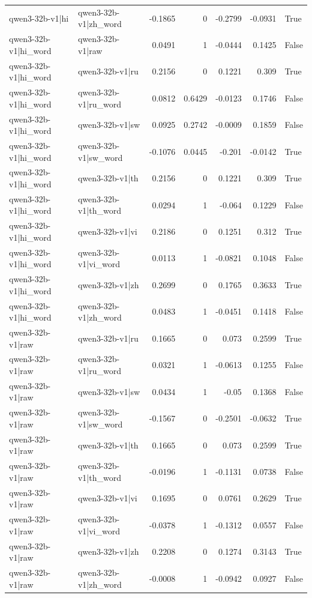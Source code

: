 \begin{table}
\begin{tabular}{l l r r r r l}
qwen3-32b-v1|hi & qwen3-32b-v1|zh_word & -0.1865 & 0 & -0.2799 & -0.0931 & True \\
qwen3-32b-v1|hi_word & qwen3-32b-v1|raw & 0.0491 & 1 & -0.0444 & 0.1425 & False \\
qwen3-32b-v1|hi_word & qwen3-32b-v1|ru & 0.2156 & 0 & 0.1221 & 0.309 & True \\
qwen3-32b-v1|hi_word & qwen3-32b-v1|ru_word & 0.0812 & 0.6429 & -0.0123 & 0.1746 & False \\
qwen3-32b-v1|hi_word & qwen3-32b-v1|sw & 0.0925 & 0.2742 & -0.0009 & 0.1859 & False \\
qwen3-32b-v1|hi_word & qwen3-32b-v1|sw_word & -0.1076 & 0.0445 & -0.201 & -0.0142 & True \\
qwen3-32b-v1|hi_word & qwen3-32b-v1|th & 0.2156 & 0 & 0.1221 & 0.309 & True \\
qwen3-32b-v1|hi_word & qwen3-32b-v1|th_word & 0.0294 & 1 & -0.064 & 0.1229 & False \\
qwen3-32b-v1|hi_word & qwen3-32b-v1|vi & 0.2186 & 0 & 0.1251 & 0.312 & True \\
qwen3-32b-v1|hi_word & qwen3-32b-v1|vi_word & 0.0113 & 1 & -0.0821 & 0.1048 & False \\
qwen3-32b-v1|hi_word & qwen3-32b-v1|zh & 0.2699 & 0 & 0.1765 & 0.3633 & True \\
qwen3-32b-v1|hi_word & qwen3-32b-v1|zh_word & 0.0483 & 1 & -0.0451 & 0.1418 & False \\
qwen3-32b-v1|raw & qwen3-32b-v1|ru & 0.1665 & 0 & 0.073 & 0.2599 & True \\
qwen3-32b-v1|raw & qwen3-32b-v1|ru_word & 0.0321 & 1 & -0.0613 & 0.1255 & False \\
qwen3-32b-v1|raw & qwen3-32b-v1|sw & 0.0434 & 1 & -0.05 & 0.1368 & False \\
qwen3-32b-v1|raw & qwen3-32b-v1|sw_word & -0.1567 & 0 & -0.2501 & -0.0632 & True \\
qwen3-32b-v1|raw & qwen3-32b-v1|th & 0.1665 & 0 & 0.073 & 0.2599 & True \\
qwen3-32b-v1|raw & qwen3-32b-v1|th_word & -0.0196 & 1 & -0.1131 & 0.0738 & False \\
qwen3-32b-v1|raw & qwen3-32b-v1|vi & 0.1695 & 0 & 0.0761 & 0.2629 & True \\
qwen3-32b-v1|raw & qwen3-32b-v1|vi_word & -0.0378 & 1 & -0.1312 & 0.0557 & False \\
qwen3-32b-v1|raw & qwen3-32b-v1|zh & 0.2208 & 0 & 0.1274 & 0.3143 & True \\
qwen3-32b-v1|raw & qwen3-32b-v1|zh_word & -0.0008 & 1 & -0.0942 & 0.0927 & False \\

\end{tabular}
\end{table}
